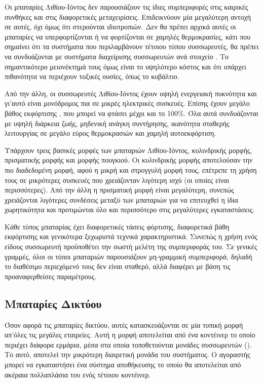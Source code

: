 \documentclass[12pt]{report}
\begin{document}
Οι μπαταρίες Λιθίου-Ιόντος δεν παρουσιάζουν τις ίδιες συμπεριφορές στις καιρικές συνθήκες και στις διαφορετικές μεταχειρίσεις. Επιδεικνύουν μία μεγαλύτερη αντοχή σε αυτές, όχι όμως ότι στερούνται ιδιοτροπιών. 
Δεν θα πρέπει αρχικά αυτές οι μπαταρίες να υπερφορτίζονται ή να φορτίζονται σε χαμηλές θερμοκρασίες, κάτι που σημαίνει ότι τα συστήματα που περιλαμβάνουν τέτοιου τύπου συσσωρευτές, θα πρέπει να συνδυάζονται με συστήματα
διαχείρισης συσσωρευτών ανά στοιχείο {}. Το σημαντικότερο μειονέκτημά τους όμως είναι το υψηλότερο κόστος και ότι υπάρχει πιθανότητα να περιέχουν τοξικές ουσίες, όπως το κοβάλτιο.

Από την άλλη, οι συσσωρευτές Λιθίου-Ιόντος έχουν υψηλή ενεργειακή πυκνότητα και γι'αυτό είναι μονόδρομος πια σε μικρές ηλεκτρικές συσκευές. Επίσης έχουν μεγάλο βάθος εκφόρτισης {}, που μπορεί
να φτάσει μέχρι και το 100\%. Όλα αυτά συνδυάζονται με υψηλή διάρκεια ζωής, μηδενική ανάγκη συντήρησης, ικανότητα σταθερής λειτουργίας σε μεγάλο εύρος θερμοκρασιών και χαμηλή αυτοεκφόρτιση.

Υπάρχουν τρεις βασικές μορφές των μπαταριών Λιθίου-Ιόντος, κυλινδρικής μορφής, πρισματικής μορφής και μορφής πουγκιού. Οι κυλινδρικής μορφής αποτελούσαν την πιο διαδεδομένη μορφή, αφού η μικρή και στρογγυλή μορφή τους, 
επέτρεπε τη χρήση τους σε μικρότερες συσκευές που χρειάζονταν λιγότερη ισχύ (οι οποίες είναι περισσότερες). Από την άλλη η πρισματική μορφή είναι μεγαλύτερη, συνεπώς χρειάζονται λιγότερες συνδέσεις μεταξύ των μπαταριών 
για να επιτευχθεί η ίδια χωρητικότητα και προτιμώνται όλο και περισσότερο στις μεγαλύτερες εγκαταστάσεις.

Κάθε τύπος μπαταρίας έχει διαφορετικές τάσεις φόρτισης, διαφορετικά βάθη εκφόρτισης και γενικότερα ξεχωριστά τεχνικά χαρακτηριστικά. Συνεπώς η χρήση ενός είδους συσσωρευτή προϋποθέτει την σωστή μελέτη της συμπεριφοράς του.
Σε γενικές γραμμές, όλοι οι τύποι μπαταριών παρουσιάζουν μη-γραμμική συμπεριφορά, δηλαδή το διαθέσιμο περιεχόμενό τους δεν είναι σταθερό, αλλά διαφέρει με βάση τις προαναφερθείσες παραμέτρους.

\subsection{Μπαταρίες Δικτύου}
Όσον αφορά τις μπαταρίες δικτύου, αυτές κατασκευάζονται σε μία τυπική μορφή απ'όλες τις μεγάλες εταιρείες. Αυτή η μορφή αποτελείται από ένα κοντέινερ το οποίο περιέχει διάφορα ερμάρια, μέσα στα οποία τοποθετούνται
μονάδες συσσωρευτών ({}). Το {} αυτό, αποτελεί την μικρότερη διαιρετική μονάδα του συστήματος. Ο αγοραστής μπορεί να εγκαταστήσει ένα
σύστημα αποθήκευσης το οποίο θα αποτελείται από ακέραια πολλαπλάσια του ενός τέτοιου κοντέινερ. 
\end{document}
